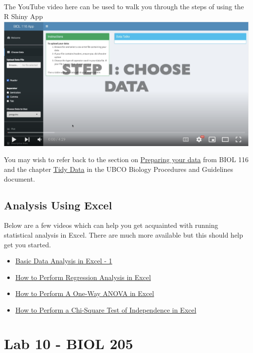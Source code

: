 \documentclass[
]{book}
\providecommand{\tightlist}{%
  \setlength{\itemsep}{0pt}\setlength{\parskip}{0pt}}
\begin{document}
The YouTube video here can be used to walk you through the steps of using the R Shiny App \includegraphics{images/shiny-app.png}

You may wish to refer back to the section on \href{https://ubco-biology.github.io/BIOL-116-Lab-Manual/preparing-your-data.html}{Preparing your data} from BIOL 116 and the chapter \href{https://ubco-biology.github.io/Procedures-and-Guidelines/tidy-data.html}{Tidy Data} in the UBCO Biology Procedures and Guidelines document.

\hypertarget{analysis-using-excel}{%
\chapter*{Analysis Using Excel}\label{analysis-using-excel}}

Below are a few videos which can help you get acquainted with running statistical analysis in Excel. There are much more available but this should help get you started.

\begin{itemize}
\tightlist
\item
  \href{https://www.youtube.com/watch?v=2xxMJEj4Oyg}{Basic Data Analysis in Excel - 1}
\item
  \href{https://www.youtube.com/watch?v=0wr9ojMxkuQ}{How to Perform Regression Analysis in Excel}
\item
  \href{https://www.youtube.com/watch?v=ZvfO7-J5u34}{How to Perform A One-Way ANOVA in Excel}
\item
  \href{https://www.youtube.com/watch?v=NDhmMH25AC4}{How to Perform a Chi-Square Test of Independence in Excel}
\end{itemize}

\hypertarget{part-lab-10---biol-205}{%
\part*{Lab 10 - BIOL 205}\label{part-lab-10---biol-205}}
\end{document}
